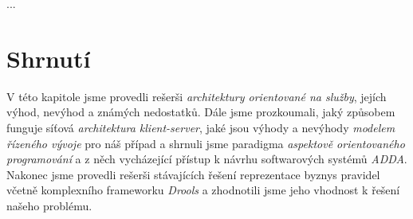 ...

\section{Shrnutí}

V této kapitole jsme provedli rešerši \textit{architektury orientované
na služby}, jejích výhod, nevýhod a známých nedostatků. Dále jsme
prozkoumali, jaký způsobem funguje síťová \textit{architektura klient-server},
jaké jsou výhody a nevýhody \textit{modelem řízeného vývoje} pro náš případ
a shrnuli jsme paradigma \textit{aspektově orientovaného programování} a
z něch vycházející přístup k návrhu softwarových systémů \textit{ADDA}.
Nakonec jsme provedli rešerši stávajících řešení reprezentace byznys pravidel
včetně komplexního frameworku \textit{Drools} a zhodnotili jsme jeho vhodnost
k řešení našeho problému.
